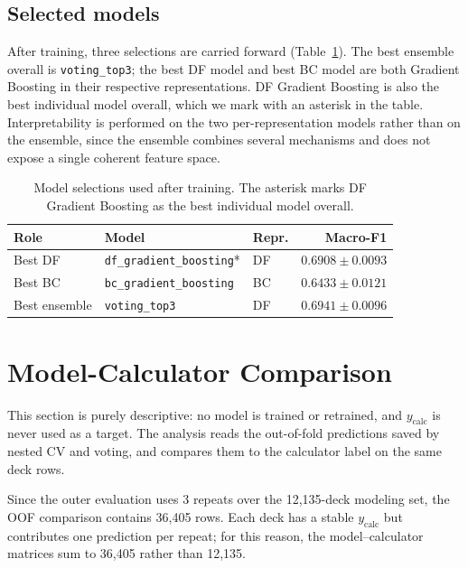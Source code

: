 \documentclass{article}
\begin{document}
\subsection{Selected models}
\label{sec:training:selection}
After training, three selections are carried forward (Table~\ref{tab:selected-models}). The best ensemble overall is \texttt{voting\_top3}; the best DF model and best BC model are both Gradient Boosting in their respective representations. DF Gradient Boosting is also the best individual model overall, which we mark with an asterisk in the table. Interpretability is performed on the two per-representation models rather than on the ensemble, since the ensemble combines several mechanisms and does not expose a single coherent feature space.

\begin{table}[h]
\centering
\caption{Model selections used after training. The asterisk marks DF Gradient Boosting as the best individual model overall.}
\label{tab:selected-models}
\small
\begin{tabular}{lllr}
\toprule
Role & Model & Repr. & Macro-F1 \\
\midrule
Best DF & \texttt{df\_gradient\_boosting}* & DF & \(\mathbf{0.6908 \pm 0.0093}\) \\
Best BC & \texttt{bc\_gradient\_boosting} & BC & \(0.6433 \pm 0.0121\) \\
Best ensemble & \texttt{voting\_top3} & DF & \(0.6941 \pm 0.0096\) \\
\bottomrule
\end{tabular}
\end{table}

\section{Model-Calculator Comparison}
\label{sec:modelcalc}

This section is purely descriptive: no model is trained or retrained, and \(y_{\text{calc}}\) is never used as a target. The analysis reads the out-of-fold predictions saved by nested CV and voting, and compares them to the calculator label on the same deck rows.

Since the outer evaluation uses 3 repeats over the 12{,}135-deck modeling set, the OOF comparison contains 36{,}405 rows. Each deck has a stable \(y_{\text{calc}}\) but contributes one prediction per repeat; for this reason, the model--calculator matrices sum to 36{,}405 rather than 12{,}135.
\end{document}
